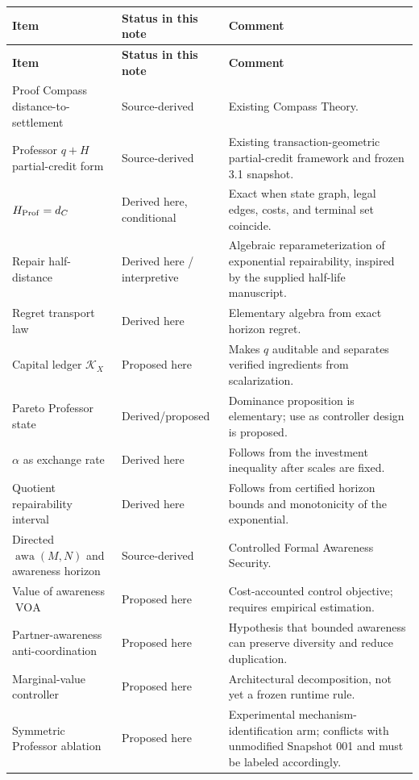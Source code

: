 \documentclass[11pt]{article}
\theoremstyle{definition}
\theoremstyle{remark}
\newcommand{\awa}{\operatorname{awa}}
\newcommand{\VOA}{\operatorname{VOA}}
\begin{document}
\begin{longtable}{p{}p{}p{}}
\toprule
\textbf{Item} & \textbf{Status in this note} & \textbf{Comment}\\
\midrule
\endfirsthead
\toprule
\textbf{Item} & \textbf{Status in this note} & \textbf{Comment}\\
\midrule
\endhead
Proof Compass distance-to-settlement & Source-derived & Existing Compass Theory.\\
Professor $q+H$ partial-credit form & Source-derived & Existing transaction-geometric partial-credit framework and frozen 3.1 snapshot.\\
$H_{\rm Prof}=d_C$ & Derived here, conditional & Exact when state graph, legal edges, costs, and terminal set coincide.\\
Repair half-distance & Derived here / interpretive & Algebraic reparameterization of exponential repairability, inspired by the supplied half-life manuscript.\\
Regret transport law & Derived here & Elementary algebra from exact horizon regret.\\
Capital ledger $\mathcal K_X$ & Proposed here & Makes $q$ auditable and separates verified ingredients from scalarization.\\
Pareto Professor state & Derived/proposed & Dominance proposition is elementary; use as controller design is proposed.\\
$\alpha$ as exchange rate & Derived here & Follows from the investment inequality after scales are fixed.\\
Quotient repairability interval & Derived here & Follows from certified horizon bounds and monotonicity of the exponential.\\
Directed $\awa(M,N)$ and awareness horizon & Source-derived & Controlled Formal Awareness Security.\\
Value of awareness $\VOA$ & Proposed here & Cost-accounted control objective; requires empirical estimation.\\
Partner-awareness anti-coordination & Proposed here & Hypothesis that bounded awareness can preserve diversity and reduce duplication.\\
Marginal-value controller & Proposed here & Architectural decomposition, not yet a frozen runtime rule.\\
Symmetric Professor ablation & Proposed here & Experimental mechanism-identification arm; conflicts with unmodified Snapshot 001 and must be labeled accordingly.\\
\bottomrule
\end{longtable}
\end{document}
